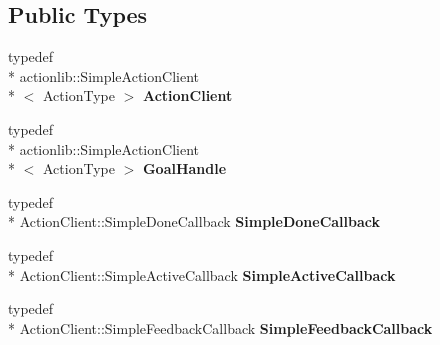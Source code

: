 \subsection*{Public Types}
\begin{DoxyCompactItemize}
\item 
\hypertarget{classsmacc_1_1SmaccActionClientBase_aea1392d9e41f48bda1de8acaec1c3233}{typedef \\*
actionlib\-::\-Simple\-Action\-Client\\*
$<$ Action\-Type $>$ {\bfseries Action\-Client}}\label{classsmacc_1_1SmaccActionClientBase_aea1392d9e41f48bda1de8acaec1c3233}

\item 
\hypertarget{classsmacc_1_1SmaccActionClientBase_a70384df77a0bbf416475e730960a77cf}{typedef \\*
actionlib\-::\-Simple\-Action\-Client\\*
$<$ Action\-Type $>$ {\bfseries Goal\-Handle}}\label{classsmacc_1_1SmaccActionClientBase_a70384df77a0bbf416475e730960a77cf}

\item 
\hypertarget{classsmacc_1_1SmaccActionClientBase_a185a419026fcdbec9ddf4703a1505524}{typedef \\*
Action\-Client\-::\-Simple\-Done\-Callback {\bfseries Simple\-Done\-Callback}}\label{classsmacc_1_1SmaccActionClientBase_a185a419026fcdbec9ddf4703a1505524}

\item 
\hypertarget{classsmacc_1_1SmaccActionClientBase_ab99def4cdf0522abaf5a3bf7a444cfcb}{typedef \\*
Action\-Client\-::\-Simple\-Active\-Callback {\bfseries Simple\-Active\-Callback}}\label{classsmacc_1_1SmaccActionClientBase_ab99def4cdf0522abaf5a3bf7a444cfcb}

\item 
\hypertarget{classsmacc_1_1SmaccActionClientBase_ad8a68f659fb23e082e75d220515c76f3}{typedef \\*
Action\-Client\-::\-Simple\-Feedback\-Callback {\bfseries Simple\-Feedback\-Callback}}\label{classsmacc_1_1SmaccActionClientBase_ad8a68f659fb23e082e75d220515c76f3}

\end{DoxyCompactItemize}

